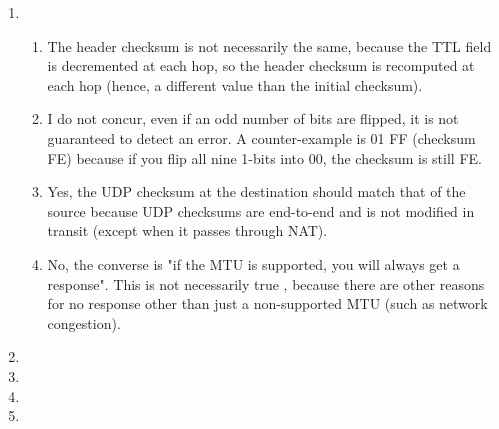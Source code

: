 \documentclass[12pt]{article}
\begin{document}
\begin{enumerate}
\begin{itemize}
	\end{itemize}
	\item %
	\begin{enumerate}
		\item The header checksum is not necessarily the same, because the TTL field is decremented at each hop, so the header checksum is recomputed at each hop (hence, a different value than the initial checksum).
		\item I do not concur, even if an odd number of bits are flipped, it is not guaranteed to detect an error. A counter-example is 01 FF (checksum FE) because if you flip all nine 1-bits into 00, the checksum is still FE.
		\item Yes, the UDP checksum at the destination should match that of the source because UDP checksums are end-to-end and is not modified in transit (except when it passes through NAT). 
		\item No, the converse is "if the MTU is supported, you will always get a response". This is not necessarily true , because there are other reasons for no response other than just a non-supported MTU (such as network congestion).
	\end{enumerate}
	\item %
	\item %
	\item %
	\item %
	

\end{enumerate}
\end{document}
